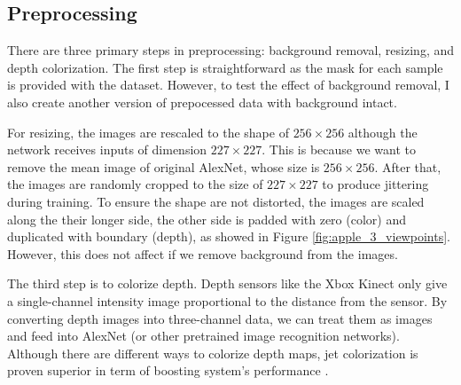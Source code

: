 \subsection{Preprocessing}\label{subsec:preprocessing}
There are three primary steps in preprocessing: background removal, resizing, and depth colorization. The first step is straightforward as the mask for each sample is provided with the dataset. However, to test the effect of background removal, I also create another version of prepocessed data with background intact. 

For resizing, the images are rescaled to the shape of $256 \times 256$ although the network receives inputs of dimension $227 \times 227$. This is because we want to remove the mean image of original AlexNet, whose size is $256 \times 256$. After that, the images are randomly cropped to the size of $227 \times 227$ to produce jittering during training. To ensure the shape are not distorted, the images are scaled along the their longer side, the other side is padded with zero (color) and duplicated with boundary (depth), as showed in Figure \ref{fig:apple_3_viewpoints}. However, this does not affect if we remove background from the images.

The third step is to colorize depth. Depth sensors like the Xbox Kinect only give a single-channel intensity image proportional to the distance from the sensor. By converting depth images into three-channel data, we can treat them as images and feed into AlexNet (or other pretrained image recognition networks). Although there are different ways to colorize depth maps, jet colorization is proven superior in term of boosting system’s performance \cite{Eitel2015}.

